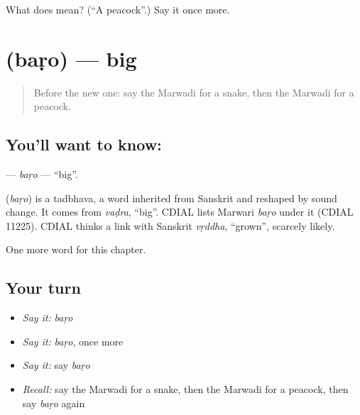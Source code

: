 \begin{tcolorbox}[breakable,colback=teal!4,colframe=teal!35!black,title={Before you move on}]
What does  mean? (\textquotedblleft{}A peacock\textquotedblright{}.) Say it once more.
\end{tcolorbox}
\section[\texorpdfstring{\mw{बड़ो} (baṛo)}{बड़ो (baṛo)}]{ (baṛo) — big}

\label{lesson:MW-C72-baro}



\begin{quote}
Before the new one: say the Marwadi for a snake, then the Marwadi for a peacock.
\end{quote}

\subsection*{You'll want to know: }
\textbf{} — \emph{baṛo} — \textquotedblleft{}big\textquotedblright{}.

\begin{cousinweb}
\textbf{} (\emph{baṛo}) is a tadbhava, a word inherited from Sanskrit and reshaped by sound change. It comes from \emph{vaḍra}, \textquotedblleft{}big\textquotedblright{}. CDIAL lists Marwari \emph{baṛo} under it (CDIAL 11225). CDIAL thinks a link with Sanskrit \emph{vṛddha}, \textquotedblleft{}grown\textquotedblright{}, scarcely likely.
\end{cousinweb}

\begin{grammarlens}[title={What you've built}]
One more word for this chapter.
\end{grammarlens}

\subsection*{Your turn}
\begin{itemize}
\raggedright
  \item \emph{Say it:} \emph{baṛo}
  \item \emph{Say it:} \emph{baṛo}, once more
  \item \emph{Say it:} say \emph{baṛo}
  \item \emph{Recall:} say the Marwadi for a snake, then the Marwadi for a peacock, then say \emph{baṛo} again
\end{itemize}

